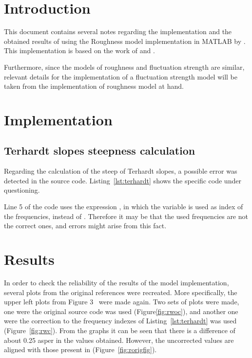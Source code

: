 \documentclass[a4paper]{article}
\begin{document}

\section{Introduction}

This document contains several notes regarding the implementation and the
obtained results of using the Roughness model implementation in MATLAB by
\citet{Schrader2002}. This implementation is based on the work of
\cite{aures1985berechnungsverfahren} and \citet{daniel1997psychoacoustical}.

Furthermore, since the models of roughness and fluctuation strength are similar,
relevant details for the implementation of a fluctuation strength model will be
taken from the implementation of roughness model at hand.

\section{Implementation}

\subsection{Terhardt slopes steepness calculation}

Regarding the calculation of the steep of Terhardt slopes, a possible error was
detected in the source code. Listing~\ref{lst:terhardt} shows the specific code
under questioning.

\lstset{inputpath=/Users/rodrigo/Documents/MATLAB/MATLAB_shared/Psychoacoustics}


Line 5 of the code uses the expression ,
in which the variable  is used as index of the frequencies,
instead of . Therefore it may be that the used
frequencies are not the correct ones, and errors might arise from this fact.

\section{Results}

In order to check the reliability of the results of the model implementation,
several plots from the original references were recreated. More specifically,
the upper left plots from Figure 3~\cite[pp.~118]{daniel1997psychoacoustical}
were made again. Two sets of plots were made, one were the original source code
was used (Figure\ref{fig:rwoc}), and another one were the correction to the
frequency indexes of Listing~\ref{lst:terhardt} was used (Figure~\ref{fig:rwc}).
From the graphs it can be seen that there is a difference of about 0.25 asper in
the values obtained. However, the uncorrected values are aligned with those
present in \citeauthor{daniel1997psychoacoustical} (Figure~\ref{fig:rorigfig}).
\end{document}

